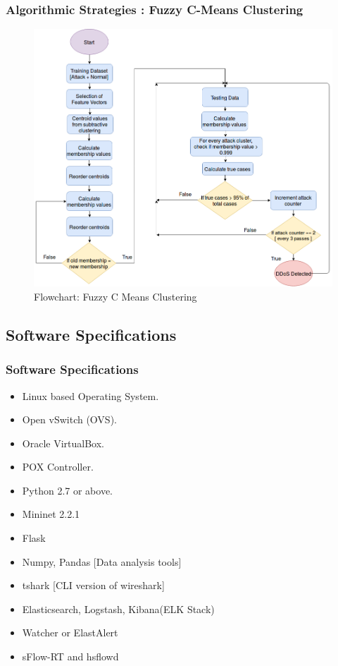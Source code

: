 \documentclass[10pt]{beamer}
\begin{document}
\begin{frame}
\frametitle{Algorithmic Strategies : Fuzzy C-Means Clustering}
\begin{figure}
\includegraphics[scale=0.27]{fuzzy.png}
\caption{\footnotesize Flowchart: Fuzzy C Means Clustering}
\end{figure}
\end{frame}

	

\begin{frame}
\section[]{Software Specifications}
\frametitle{Software Specifications}
\begin{itemize}
\footnotesize
\item
Linux based Operating System.
\item
Open vSwitch (OVS).
\item
Oracle VirtualBox.
\item
POX Controller.
\item
Python 2.7 or above.
\item
Mininet 2.2.1
\item
Flask
\item
Numpy, Pandas [Data analysis tools]
\item
tshark [CLI version of wireshark]
\item
Elasticsearch, Logstash, Kibana(ELK Stack)
\item
Watcher or ElastAlert
\item
sFlow-RT and hsflowd
\end{itemize}
\end{frame}
\end{document}
